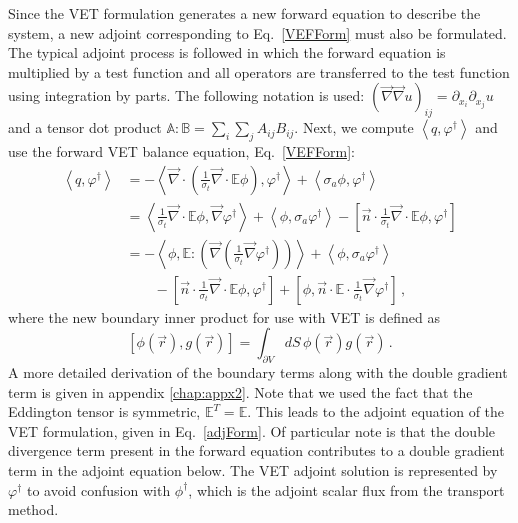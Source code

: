 \documentclass[12pt]{report}
\newcommand{\vr}{\vec{r}}
\newcommand{\bra}{\left\langle}
\newcommand{\ket}{\right\rangle}
\newcommand{\sbra}{\left[}
\newcommand{\sket}{\right]}
\renewcommand{\div}{\vec{\nabla} \cdot}
\newcommand{\grad}{\vec{\nabla}}
\newcommand{\vefadj}{\varphi^\dag}
\newcommand{\vn}{\vec{n}}
\newcommand{\Edd}{\mathbb{E}}
\newcommand{\sigt}{\sigma_t}
\newcommand{\siga}{\sigma_a}
\newcommand{\scalSource}{q}
\begin{document}
Since the VET formulation generates a new forward equation to describe the system, a new adjoint corresponding to Eq.~\eqref{VEFForm} must also be formulated. The typical adjoint process is followed in which the forward equation is multiplied by a test function and all operators are transferred to the test function using integration by parts. The following notation is used: $(\grad \grad u)_{ij} = \partial_{x_i} \partial_{x_j} u$
and a tensor dot product $\mathbb{A} : \mathbb{B} = \sum_i \sum_j A_{ij}B_{ij}$.
Next, we compute $\bra \scalSource , \vefadj \ket$ and use the forward VET balance equation, Eq.~\eqref{VEFForm}:
\begin{equation}
\label{VEFadjFormDeriv}
\begin{split}
\bra \scalSource , \vefadj \ket &= - \bra \div \left( \frac{1}{\sigt}\div \Edd \phi \right), \vefadj \ket +  \bra \siga \phi, \vefadj \ket   \\
&= \bra \frac{1}{\sigt}\div \Edd \phi, \grad \vefadj \ket  +  \bra  \phi, \siga \vefadj \ket - \sbra \vn \cdot \frac{1}{\sigt}\div \Edd \phi, \vefadj \sket   \\
 &=  - \bra \phi, \Edd : \left( \grad \left( \frac{1}{\sigt}\grad \vefadj \right) \right) \ket  +  \bra  \phi, \siga \vefadj \ket \\
 &\quad\quad  - \sbra \vn \cdot  \frac{1}{\sigt}\div \Edd \phi, \vefadj \sket + \sbra \phi, \vn \cdot  \Edd \cdot \frac{1}{\sigt} \grad \vefadj \sket  \,,
\end{split}
\end{equation}
where the new boundary inner product for use with VET is defined as
\begin{equation}
\sbra \phi(\vr) , g(\vr)  \sket = \int_{\partial V} dS \, \phi (\vr) g (\vr)  \,.
\end{equation}
A more detailed derivation of the boundary terms along with the double gradient term is given in appendix \ref{chap:appx2}. Note that we used the fact that the Eddington tensor is symmetric, $\Edd^T=\Edd$.
This leads to the adjoint equation of the VET formulation, given in Eq.~\eqref{adjForm}. Of particular note is that the double divergence term present in the forward equation contributes to a double gradient term in the adjoint equation below. The VET adjoint solution is represented by $\vefadj$ to avoid confusion with $\phi^\dag$, which is the adjoint scalar flux from the transport  method. 
\end{document}
